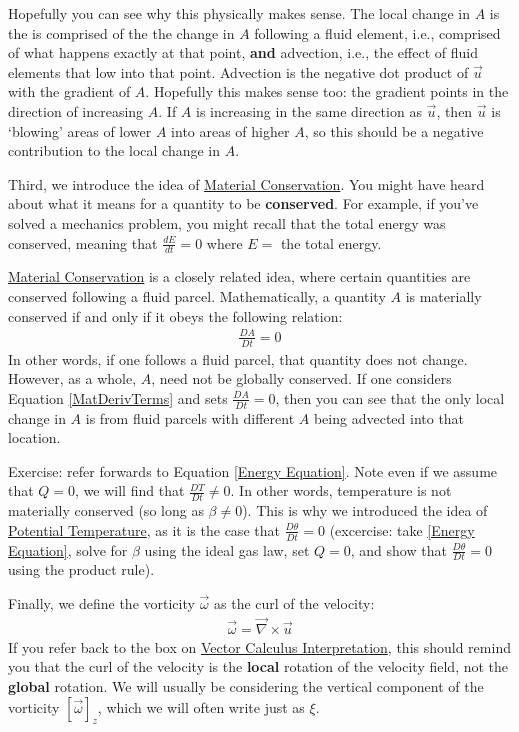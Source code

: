 Hopefully you can see why this physically makes sense. The local change in $A$ is the is comprised of the the change in $A$ following a fluid element, i.e., comprised of what happens exactly at that point, \textbf{and} advection, i.e., the effect of fluid elements that low into that point. Advection is the negative dot product of $\vec{u}$ with the gradient of $A$. Hopefully this makes sense too: the gradient points in the direction of increasing $A$. If $A$ is increasing in the same direction as $\vec{u}$, then $\vec{u}$ is `blowing' areas of lower $A$ into areas of higher $A$, so this should be a negative contribution to the local change in $A$.

Third, we introduce the idea of \hyperref[Material Conservation]{Material Conservation}. You might have heard about what it means for a quantity to be \textbf{conserved}. For example, if you've solved a mechanics problem, you might recall that the total energy was conserved, meaning that $\frac{dE}{dt}=0$ where $E=$ the total energy.

\hyperref[Material Conservation]{Material Conservation} is a closely related idea, where certain quantities are conserved following a fluid parcel. Mathematically, a quantity $A$ is materially conserved if and only if it obeys the following relation:
\begin{align}\label{Material Conservation}
    \frac{D A}{Dt }=0
\end{align}
In other words, if one follows a fluid parcel, that quantity does not change. However, as a whole, $A$, need not be globally conserved. If one considers Equation \ref{MatDerivTerms} and sets $\frac{D A}{Dt }=0$, then you can see that the only local change in $A$ is from fluid parcels with different $A$ being advected into that location.

Exercise: refer forwards to Equation \ref{Energy Equation}. Note even if we assume that $Q=0$, we will find that $\frac{DT}{Dt}\neq 0$. In other words, temperature is not materially conserved (so long as $\beta\neq0$). This is why we introduced the idea of \hyperref[Potential Temperature]{Potential Temperature}, as it is the case that $\frac{D\theta}{Dt}=0$ (excercise: take \ref{Energy Equation}, solve for $\beta$ using the ideal gas law, set $Q=0$, and show that $\frac{D\theta}{Dt}=0$ using the product rule).

Finally, we define the vorticity $\vec{\omega}$ as the curl of the velocity:
\begin{align}
    \vec{\omega}=\vec{\nabla}\times\vec{u}
\end{align}
If you refer back to the box on \hyperref[VC Interp]{Vector Calculus Interpretation}, this should remind you that the curl of the velocity is the \textbf{local} rotation of the velocity field, not the \textbf{global} rotation. We will usually be considering the vertical component of the vorticity $[\vec{\omega}]_z$, which we will often write just as $\xi$.

